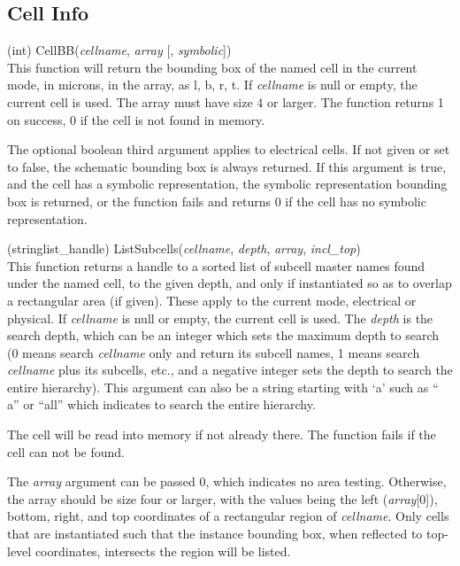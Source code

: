 \subsection{Cell Info}

\begin{description}
\item{(int) \vt CellBB({\it cellname\/}, {\it array\/} [, {\it symbolic\/}])}\\
This function will return the bounding box of the named cell in the
current mode, in microns, in the array, as l, b, r, t.  If {\it
cellname} is null or empty, the current cell is used.  The array must
have size 4 or larger.  The function returns 1 on success, 0 if the
cell is not found in memory.

The optional boolean third argument applies to electrical cells.  If
not given or set to false, the schematic bounding box is always
returned.  If this argument is true, and the cell has a symbolic
representation, the symbolic representation bounding box is returned,
or the function fails and returns 0 if the cell has no symbolic
representation.

\item{(stringlist\_handle) \vt ListSubcells({\it cellname\/}, {\it depth\/},
 {\it array\/}, {\it incl\_top\/})}\\
This function returns a handle to a sorted list of subcell master
names found under the named cell, to the given depth, and only if
instantiated so as to overlap a rectangular area (if given).  These
apply to the current mode, electrical or physical.  If {\it cellname}
is null or empty, the current cell is used.  The {\it depth} is the
search depth, which can be an integer which sets the maximum depth to
search (0 means search {\it cellname} only and return its subcell
names, 1 means search {\it cellname} plus its subcells, etc., and a
negative integer sets the depth to search the entire hierarchy).  This
argument can also be a string starting with `{\vt a}' such as ``{\vt
a}'' or ``{\vt all}'' which indicates to search the entire hierarchy.

The cell will be read into memory if not already there.  The function
fails if the cell can not be found.

The {\it array} argument can be passed 0, which indicates no area
testing.  Otherwise, the array should be size four or larger, with the
values being the left ({\it array\/}[0]), bottom, right, and top
coordinates of a rectangular region of {\it cellname}.  Only cells
that are instantiated such that the instance bounding box, when
reflected to top-level coordinates, intersects the region will be
listed.


\end{description}
